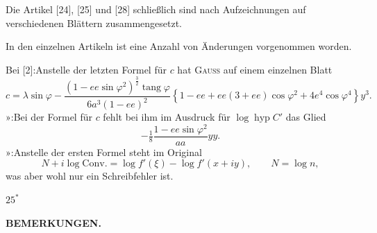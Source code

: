 {Die Artikel [24], [25] und [28] schließlich sind nach Aufzeichnungen auf verschiedenen
Blättern zusammengesetzt.

\medskip
In den einzelnen Artikeln ist eine Anzahl von Änderungen vorgenommen worden.

\medskip
\noindent Bei [2]:\quad Anstelle der letzten Formel für \(c\) hat \textsc{Gauss} auf einem einzelnen Blatt
\[
c=\lambda\sin\varphi-
\frac{(1-ee\sin\varphi^2)^{\frac32}\operatorname{tang}\varphi}{6a^3(1-ee)^2}
\left\{1-ee+ee(3+ee)\cos\varphi^2+4e^4\cos\varphi^4\right\}y^3.
\]
\noindent »\quad [4]:\quad Bei der Formel für \(c\) fehlt bei ihm im Ausdruck für \(\log\operatorname{hyp} C'\) das Glied
\[
-\tfrac18\frac{1-ee\sin\varphi^2}{aa}yy.
\]
\noindent »\quad [7]:\quad Anstelle der ersten Formel steht im Original
\[
N+i\log\mathrm{Conv.}=\log f'(\xi)-\log f'(x+iy),\qquad N=\log n,
\]
\noindent\hspace*{3.5em}was aber wohl nur ein Schreibfehler ist.
\par}
\noindent\hfill \(25^{*}\)\hspace*{.12\linewidth}\par

\par\clearpage
\noindent{}\hfill{\small\textbf{BEMERKUNGEN.}}\hfill\null\par\medskip


